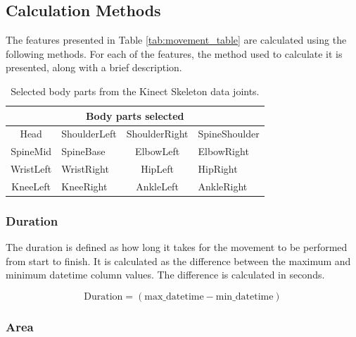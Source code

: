         \subsection{Calculation Methods}

            The features presented in Table \ref{tab:movement_table} are calculated using the following methods. For each of the features, the method used to calculate it is presented, along with a brief description.

            \begin{table}[ht]
                \centering
                \begin{tabular}{@{}clcl@{}}
                    \toprule
                    \multicolumn{4}{c}{\textbf{Body parts selected}} \\
                    \midrule
                     Head & ShoulderLeft & ShoulderRight & SpineShoulder \\
                     SpineMid & SpineBase & ElbowLeft & ElbowRight \\
                     WristLeft & WristRight & HipLeft & HipRight \\
                     KneeLeft & KneeRight & AnkleLeft & AnkleRight \\
                    \bottomrule
                \end{tabular}
                \caption{Selected body parts from the Kinect Skeleton data joints.}
                \label{tab:body_parts_table}
            \end{table} 

            \subsubsection{Duration}

                The duration is defined as how long it takes for the movement to be performed from start to finish. It is calculated as the difference between the maximum and minimum datetime column values. The difference is calculated in seconds.

                \begin{equation}\label{eq:duration}
                    \text{Duration} = (\text{{max\_datetime}} - \text{{min\_datetime}})
                \end{equation}
            
            \subsubsection{Area}

